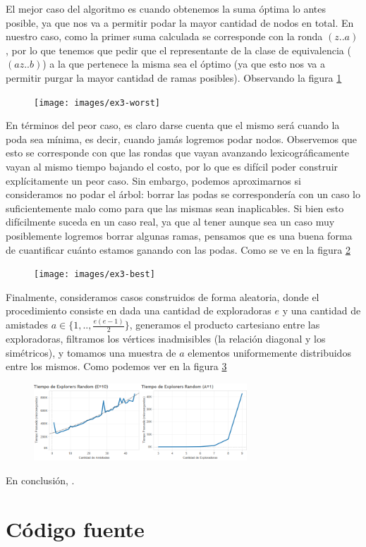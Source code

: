 \documentclass{article}
\theoremstyle{definition}
\theoremstyle{remark}
\begin{document}
El mejor caso del algoritmo es cuando obtenemos la suma óptima lo antes posible, ya que nos va a permitir podar la mayor cantidad de nodos en total. En nuestro caso, como la primer suma calculada se corresponde con la ronda $(z..a)$, por lo que tenemos que pedir que el representante de la clase de equivalencia ($(a z .. b)$) a la que pertenece la misma sea el óptimo (ya que esto nos va a permitir purgar la mayor cantidad de ramas posibles). Observando la figura \ref{grf:ex3-worst}

\begin{figure}[h!]
\centering
\label{grf:ex3-worst}
\texttt{[image: images/ex3-worst]}
\caption{}
\end{figure}

En términos del peor caso, es claro darse cuenta que el mismo será cuando la poda sea mínima, es decir, cuando jamás logremos podar nodos. Observemos que esto se corresponde con que las rondas que vayan avanzando lexicográficamente vayan al mismo tiempo bajando el costo, por lo que es difícil poder construir explícitamente un peor caso. Sin embargo, podemos aproximarnos si consideramos no podar el árbol: borrar las podas se correspondería con un caso lo suficientemente malo como para que las mismas sean inaplicables. Si bien esto difícilmente suceda en un caso real, ya que al tener aunque sea un caso muy posiblemente logremos borrar algunas ramas, pensamos que es una buena forma de cuantificar cuánto estamos ganando con las podas. Como se ve en la figura \ref{grf:ex3-best}

\begin{figure}[h!]
\centering
\label{grf:ex3-best}
\texttt{[image: images/ex3-best]}
\caption{}
\end{figure}

Finalmente, consideramos casos construidos de forma aleatoria, donde el procedimiento consiste en dada una cantidad de exploradoras $e$ y una cantidad de amistades $a \in \{1, .., \frac{e(e-1)}{2}\}$, generamos el producto cartesiano entre las exploradoras, filtramos los vértices inadmisibles (la relación diagonal y los simétricos), y tomamos una muestra de $a$ elementos uniformemente distribuidos entre los mismos. Como podemos ver en la figura \ref{grf:ex3-random}

\begin{figure}[h!]
\centering
\label{grf:ex3-random}
\includegraphics[width=8cm]{images/ex3-random}
\caption{}
\end{figure}


En conclusión, .

\section{Código fuente}
\end{document}
